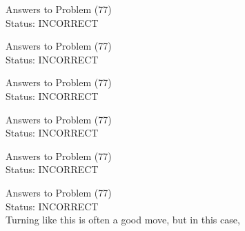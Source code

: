 \documentclass[11pt]{article}
\begin{document}
\begin{minipage}[t]{0.5\textwidth}
  {\centering
  
  Answers to Problem (77)\\
  Status: INCORRECT\\
  
  }
\end{minipage}
\begin{minipage}[t]{0.5\textwidth}
  {\centering
  
  Answers to Problem (77)\\
  Status: INCORRECT\\
  
  }
\end{minipage}
\begin{minipage}[t]{0.5\textwidth}
  {\centering
  
  Answers to Problem (77)\\
  Status: INCORRECT\\
  
  }
\end{minipage}
\begin{minipage}[t]{0.5\textwidth}
  {\centering
  
  Answers to Problem (77)\\
  Status: INCORRECT\\
  
  }
\end{minipage}
\begin{minipage}[t]{0.5\textwidth}
  {\centering
  
  Answers to Problem (77)\\
  Status: INCORRECT\\
  
  }
\end{minipage}
\begin{minipage}[t]{0.5\textwidth}
  {\centering
  
  Answers to Problem (77)\\
  Status: INCORRECT\\
  Turning like this is often a good move, but in this case,\\
  }
\end{minipage}
\end{document}
